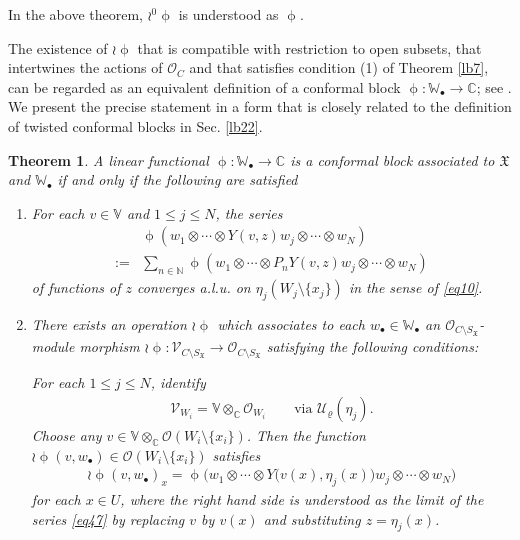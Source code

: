 \documentclass[11pt,b5paper,notitlepage]{article}
\theoremstyle{definition}
\theoremstyle{plain}
\newtheorem{thm}[df]{Theorem}
\newcommand{\fk}{\mathfrak}
\newcommand{\mc}{\mathcal}
\newcommand{\scr}{\mathscr}
\newcommand{\SX}{{S_{\fk X}}}
\newcommand{\blt}{\bullet}
\newcommand{\Vbb}{\mathbb V}
\newcommand{\Wbb}{\mathbb W}
\newcommand{\Cbb}{\mathbb C}
\newcommand{\Nbb}{\mathbb N}
\numberwithin{equation}{subsection}
\begin{document}
In the above theorem, $\wr^0\upphi$ is understood as $\upphi$.

The existence of $\wr\upphi$ that is compatible with restriction to open subsets, that intertwines the actions of $\scr O_C$ and that satisfies condition (1) of Theorem \ref{lb7}, can be regarded as an equivalent definition of a conformal block $\upphi:\Wbb_\blt\rightarrow\Cbb$; see \cite[10.1.2]{FB04}. We present the precise statement in a form that is closely related to the definition of twisted conformal blocks in Sec. \ref{lb22}.

\begin{thm}\label{lb24}
A linear functional $\upphi:\Wbb_\blt\rightarrow\Cbb$ is a conformal block associated to $\fk X$ and $\Wbb_\blt$ if and only if the following are satisfied
\begin{enumerate}
\item For each $v\in\Vbb$ and $1\leq j\leq N$, the series 
\begin{align}
&\upphi(w_1\otimes\cdots\otimes Y(v,z)w_j\otimes\cdots\otimes w_N)\nonumber\\
:=&\sum_{n\in \Nbb}\upphi(w_1\otimes\cdots\otimes P_nY(v,z)w_j\otimes\cdots\otimes w_N)\label{eq47}
\end{align}
of functions of $z$ converges a.l.u. on $\eta_j(W_j\setminus\{x_j\})$ in the sense of \eqref{eq10}.

\item There exists an operation $\wr\upphi$ which associates to each $w_\blt\in\Wbb_\blt$ an $\scr O_{C\setminus\SX}$-module morphism $\wr\upphi:\scr V_{C\setminus\SX}\rightarrow\scr O_{C\setminus\SX}$ satisfying the following conditions:




For each $1\leq j\leq N$, identify
\begin{align*}
	\scr V_{W_i}=\Vbb\otimes_\Cbb\scr O_{W_i}\qquad\text{via }\mc U_\varrho(\eta_j).	
\end{align*}
Choose any $v\in\Vbb\otimes_\Cbb\scr O(W_i\setminus\{x_i\})$. Then the function $\wr\upphi(v,w_\blt)\in\scr O(W_i\setminus\{x_i\})$ satisfies
\begin{align}
\wr\upphi(v,w_\blt)_x=\upphi\big(w_1\otimes\cdots\otimes Y\big(v(x),\eta_j(x)\big)w_j\otimes\cdots\otimes w_N\big)	\label{eq49}
\end{align}
for each $x\in U$, where the right hand side is understood as the limit of the series \eqref{eq47} by replacing $v$ by $v(x)$ and substituting $z=\eta_j(x)$.
\end{enumerate}
\end{thm}
\end{document}
